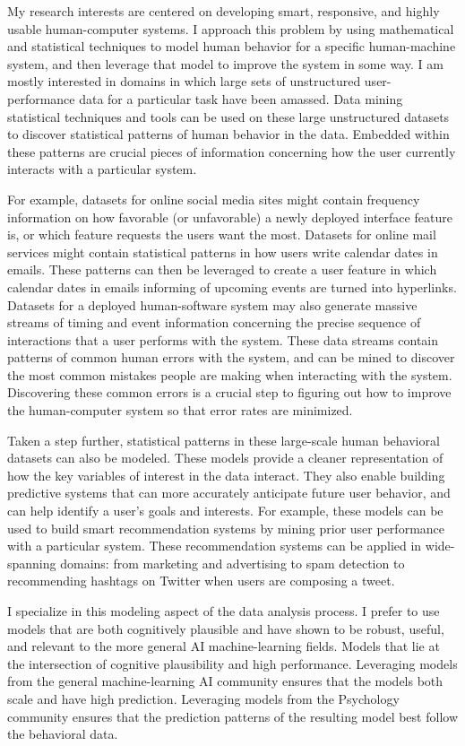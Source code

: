 My research interests are centered on developing smart, responsive, and highly usable human-computer systems.
I approach this problem by using mathematical and statistical techniques to model human behavior for a specific human-machine system, and then leverage that model to improve the system in some way.
I am mostly interested in domains in which large sets of unstructured user-performance data for a particular task have been amassed.
Data mining statistical techniques and tools can be used on these large unstructured datasets to discover statistical patterns of human behavior in the data.
Embedded within these patterns are crucial pieces of information concerning how the user currently interacts with a particular system.

For example, datasets for online social media sites might contain frequency information on how favorable (or unfavorable) a newly deployed interface feature is,
or which feature requests the users want the most.
Datasets for online mail services might contain statistical patterns in how users write calendar dates in emails.
These patterns can then be leveraged to create a user feature in which calendar dates in emails informing of upcoming events are turned into hyperlinks.
Datasets for a deployed human-software system may also generate massive streams of timing and event information concerning the precise sequence of interactions that a user performs with the system.
These data streams contain patterns of common human errors with the system, and can be mined to discover the most common mistakes people are making when interacting with the system.
Discovering these common errors is a crucial step to figuring out how to improve the human-computer system so that error rates are minimized.

Taken a step further, statistical patterns in these large-scale human behavioral datasets can also be modeled.
These models provide a cleaner representation of how the key variables of interest in the data interact.
They also enable building predictive systems that can more accurately anticipate future user behavior, and can help identify a user's goals and interests.
For example, these models can be used to build smart recommendation systems by mining prior user performance with a particular system.
These recommendation systems can be applied in wide-spanning domains: from marketing and advertising to spam detection to recommending hashtags on Twitter when users are composing a tweet.

I specialize in this modeling aspect of the data analysis process.
I prefer to use models that are both cognitively plausible and have shown to be robust, useful, and relevant to the more general AI machine-learning fields.
Models that lie at the intersection of cognitive plausibility and high performance.
Leveraging models from the general machine-learning AI community ensures that the models both scale and have high prediction.
Leveraging models from the Psychology community ensures that the prediction patterns of the resulting model best follow the behavioral data.
